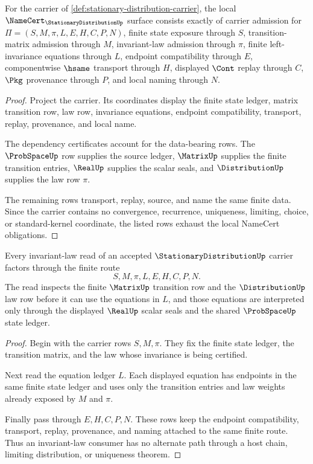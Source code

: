 \begin{theorem}
\label{thm:stationary-distribution-namecert-obligations}
For the carrier of \autoref{def:stationary-distribution-carrier}, the local
$\NameCert_{\StationaryDistributionUp}$ surface consists exactly of carrier
admission for $\Pi=(S,M,\pi,L,E,H,C,P,N)$, finite state exposure through $S$,
transition-matrix admission through $M$, invariant-law admission through
$\pi$, finite left-invariance equations through $L$, endpoint compatibility
through $E$, componentwise $\hsame$ transport through $H$, displayed $\Cont$
replay through $C$, $\Pkg$ provenance through $P$, and local naming through
$N$.
\end{theorem}
\begin{proof}
Project the carrier. Its coordinates display the finite state ledger, matrix
transition row, law row, invariance equations, endpoint compatibility,
transport, replay, provenance, and local name.

The dependency certificates account for the data-bearing rows. The
$\ProbSpaceUp$ row supplies the source ledger, $\MatrixUp$ supplies the finite
transition entries, $\RealUp$ supplies the scalar seals, and
$\DistributionUp$ supplies the law row $\pi$.

The remaining rows transport, replay, source, and name the same finite data.
Since the carrier contains no convergence, recurrence, uniqueness, limiting,
choice, or standard-kernel coordinate, the listed rows exhaust the local
NameCert obligations.
\end{proof}

\begin{theorem}
\label{thm:stationary-distribution-invariance-scope}
Every invariant-law read of an accepted $\StationaryDistributionUp$ carrier
factors through the finite route
$$
S,M,\pi,L,E,H,C,P,N.
$$
The read inspects the finite $\MatrixUp$ transition row and the
$\DistributionUp$ law row before it can use the equations in $L$, and those
equations are interpreted only through the displayed $\RealUp$ scalar seals
and the shared $\ProbSpaceUp$ state ledger.
\end{theorem}
\begin{proof}
Begin with the carrier rows $S,M,\pi$. They fix the finite state ledger, the
transition matrix, and the law whose invariance is being certified.

Next read the equation ledger $L$. Each displayed equation has endpoints in
the same finite state ledger and uses only the transition entries and law
weights already exposed by $M$ and $\pi$.

Finally pass through $E,H,C,P,N$. These rows keep the endpoint compatibility,
transport, replay, provenance, and naming attached to the same finite route.
Thus an invariant-law consumer has no alternate path through a host chain,
limiting distribution, or uniqueness theorem.
\end{proof}

